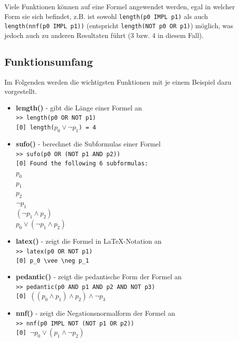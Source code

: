 \documentclass[11pt,a4paper,ngerman]{scrreprt}
\begin{document}
Viele Funktionen können auf eine Formel angewendet werden, egal in welcher Form sie sich befindet, z.B. ist sowohl \texttt{length(p0 IMPL p1)} als auch \texttt{length(nnf(p0 IMPL p1))} (entspricht \texttt{length(NOT p0 OR p1)}) möglich, was jedoch auch zu anderen Resultaten führt (3 bzw. 4 in diesem Fall).

\subsection{Funktionsumfang}
Im Folgenden werden die wichtigsten Funktionen mit je einem Beispiel dazu vorgestellt.
\begin{itemize}
\item \textbf{length()} - gibt die Länge einer Formel an \\
\texttt{>> length(p0 OR NOT p1)} \\
\texttt{[0] length($p_0 \vee \neg p_1$) = 4}

\item \textbf{sufo()} - berechnet die Subformulas einer Formel \\
\texttt{>> sufo(p0 OR (NOT p1 AND p2))} \\
\texttt{[0] Found the following 6 subformulas: \\
$p_0$ \\
$p_1$ \\
$p_2$ \\
$\neg p_1$ \\
$( \neg p_1 \wedge p_2 )$ \\
$p_0 \vee ( \neg p_1 \wedge p_2 )$}

\item \textbf{latex()} - zeigt die Formel in \LaTeX-Notation an \\
\texttt{>> latex(p0 OR NOT p1)} \\
\texttt{[0] p\_0 \textbackslash vee \textbackslash neg p\_1}

\item \textbf{pedantic()} - zeigt die pedantische Form der Formel an \\
\texttt{>> pedantic(p0 AND p1 AND p2 AND NOT p3)} \\
\texttt{[0] $( ( p_0 \wedge p_1 ) \wedge p_2 ) \wedge \neg p_3$}

\item \textbf{nnf()} - zeigt die Negationsnormalform der Formel an \\
\texttt{>> nnf(p0 IMPL NOT (NOT p1 OR p2))} \\
\texttt{[0] $\neg p_0 \vee ( p_1 \wedge \neg p_2 )$}


\end{itemize}
\end{document}
